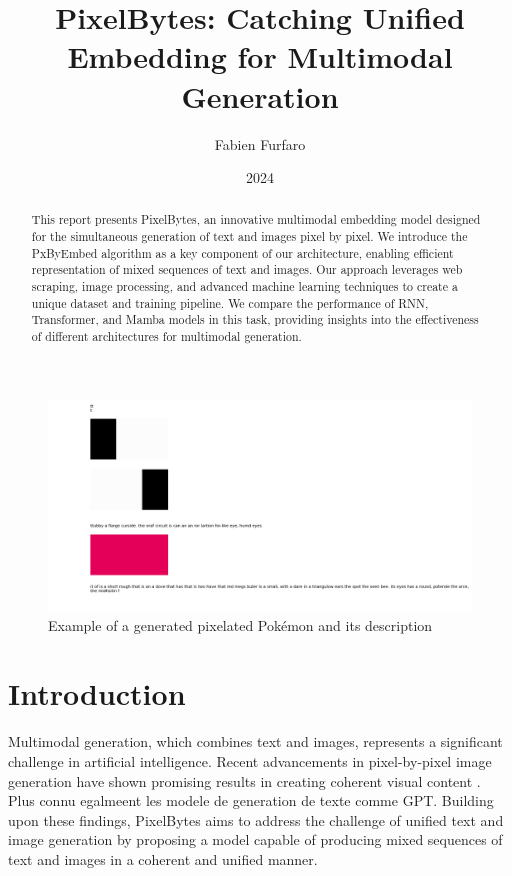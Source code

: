 \documentclass[10pt,a4paper]{article}
\title{\Large\textbf{PixelBytes: Catching Unified Embedding for Multimodal Generation}}
\author{\large Fabien Furfaro}
\date{\large 2024}
\begin{document}
\maketitle

\begin{abstract}
This report presents PixelBytes, an innovative multimodal embedding model designed for the simultaneous generation of text and images pixel by pixel. We introduce the PxByEmbed algorithm as a key component of our architecture, enabling efficient representation of mixed sequences of text and images. Our approach leverages web scraping, image processing, and advanced machine learning techniques to create a unique dataset and training pipeline. We compare the performance of RNN, Transformer, and Mamba models in this task, providing insights into the effectiveness of different architectures for multimodal generation.
\end{abstract}

\begin{figure}[h]
\centering
\includegraphics[width=0.8\linewidth]{example_generation.png}
\caption{Example of a generated pixelated Pokémon and its description}
\label{fig:example_generation}
\end{figure}

\section{Introduction}
Multimodal generation, which combines text and images, represents a significant challenge in artificial intelligence. Recent advancements in pixel-by-pixel image generation have shown promising results in creating coherent visual content \cite{parmar2018image}. Plus connu egalmeent les modele de generation de texte comme GPT. Building upon these findings, PixelBytes aims to address the challenge of unified text and image generation by proposing a model capable of producing mixed sequences of text and images in a coherent and unified manner.
\end{document}
